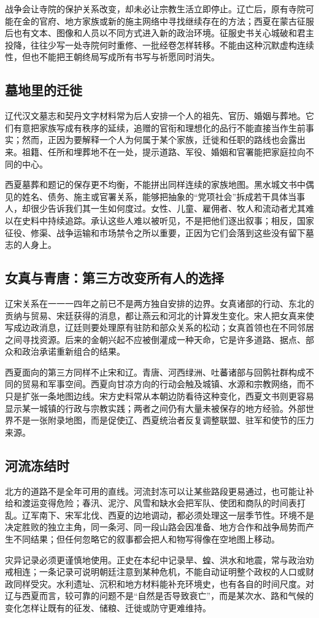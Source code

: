 战争会让寺院的保护关系改变，却未必让宗教生活立即停止。辽亡后，原有寺院可能在金的官府、地方家族或新的施主网络中寻找继续存在的方法；西夏在蒙古征服后也有文本、图像和人员以不同方式进入新的政治环境。征服史书关心城破和君主投降，往往少写一处寺院何时重修、一批经卷怎样转移。不能由这种沉默虚构连续性，但也不能把王朝终局写成所有书写与祈愿同时消失。

\subsection{墓地里的迁徙}

辽代汉文墓志和契丹文字材料常为后人安排一个人的祖先、官历、婚姻与葬地。它们有意把家族写成有秩序的延续，追赠的官衔和理想化的品行不能直接当作生前事实；然而，正因为要解释一个人为何属于某个家族，迁徙和任职的路线也会露出来。祖籍、任所和埋葬地不在一处，提示道路、军役、婚姻和官署能把家庭拉向不同的中心。

西夏墓葬和题记的保存更不均衡，不能拼出同样连续的家族地图。黑水城文书中偶见的姓名、债务、施主或官署关系，能够把抽象的“党项社会”拆成若干具体当事人，却很少告诉我们其一生如何度过。女性、儿童、雇佣者、牧人和流动者尤其难以在史料中持续追踪。承认这些人难以被听见，不是把他们逐出叙事；相反，国家征役、修渠、战争运输和市场禁令之所以重要，正因为它们会落到这些没有留下墓志的人身上。

\subsection{女真与青唐：第三方改变所有人的选择}

辽宋关系在一一一四年之前已不是两方独自安排的边界。女真诸部的行动、东北的贡纳与贸易、宋廷获得的消息，都让燕云和河北的计算发生变化。宋人把女真来使写成边政消息，辽廷则要处理原有驻防和部众关系的松动；女真首领也在不同邻居之间寻找资源。后来的金朝兴起不应被倒灌成一种天命，它是许多道路、据点、部众和政治承诺重新组合的结果。

西夏面向的第三方同样不止宋和辽。青唐、河西绿洲、吐蕃诸部与回鹘社群构成不同的贸易和军事空间。西夏向甘凉方向的行动会触及城镇、水源和宗教网络，而不只是扩张一条地图边线。宋方史料常从本朝边防看待这种变化，西夏文书则更容易显示某一城镇的行政与宗教实践；两者之间仍有大量未被保存的地方经验。外部世界不是一张附录地图，而是促使辽、西夏统治者反复调整联盟、驻军和使节的压力来源。

\subsection{河流冻结时}

北方的道路不是全年可用的直线。河流封冻可以让某些路段更易通过，也可能让补给和渡运变得危险；春汛、泥泞、风雪和缺水会把军队、使团和商队的时间表打乱。辽军南下、宋军北伐、西夏的边地调动，都必须处理这一层季节性。环境不是决定胜败的独立主角，同一条河、同一段山路会因准备、地方合作和战争局势而产生不同结果；但任何忽略它的叙事都会把人和物写得像在空地图上移动。

灾异记录必须更谨慎地使用。正史在本纪中记录旱、蝗、洪水和地震，常与政治劝戒相连；一条记录可说明朝廷注意到某种危机，不能自动证明整个政权的人口或财政同样受灾。水利遗址、沉积和地方材料能补充环境史，也有各自的时间尺度。对辽与西夏而言，较可靠的问题不是“自然是否导致衰亡”，而是某次水、路和气候的变化怎样让既有的征发、储粮、迁徙或防守更难维持。
